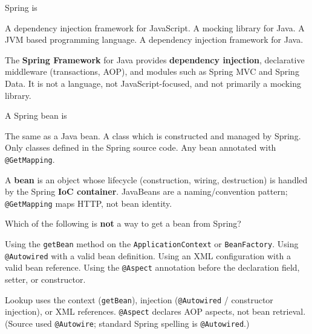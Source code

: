


\question[4]
Spring is
\begin{choices}
  \choice A dependency injection framework for JavaScript.
  \choice A mocking library for Java.
  \choice A JVM based programming language.
  \CorrectChoice A dependency injection framework for Java.
\end{choices}
\begin{solution}
  The \textbf{Spring Framework} for Java provides \textbf{dependency injection}, declarative middleware (transactions, AOP), and modules such as Spring MVC and Spring Data. It is not a language, not JavaScript-focused, and not primarily a mocking library.
\end{solution}

\question[4]
A Spring bean is
\begin{choices}
  \choice The same as a Java bean.
  \CorrectChoice A class which is constructed and managed by Spring.
  \choice Only classes defined in the Spring source code.
  \choice Any bean annotated with \texttt{@GetMapping}.
\end{choices}
\begin{solution}
  A \textbf{bean} is an object whose lifecycle (construction, wiring, destruction) is handled by the Spring \textbf{IoC container}. JavaBeans are a naming/convention pattern; \texttt{@GetMapping} maps HTTP, not bean identity.
\end{solution}

\question[4]
Which of the following is \textbf{not} a way to get a bean from Spring?
\begin{choices}
  \choice Using the \texttt{getBean} method on the \texttt{ApplicationContext} or \texttt{BeanFactory}.
  \choice Using \texttt{@Autowired} with a valid bean definition.
  \choice Using an XML configuration with a valid bean reference.
  \CorrectChoice Using the \texttt{@Aspect} annotation before the declaration field, setter, or constructor.
\end{choices}
\begin{solution}
  Lookup uses the context (\texttt{getBean}), injection (\texttt{@Autowired} / constructor injection), or XML references. \texttt{@Aspect} declares AOP aspects, not bean retrieval. (Source used \texttt{@Autowire}; standard Spring spelling is \texttt{@Autowired}.)
\end{solution}

